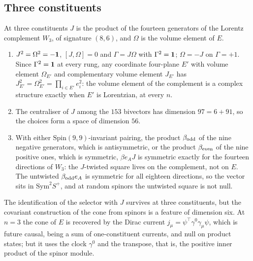 \subsection{Three constituents}

At three constituents $J$ is the product of the fourteen generators of the Lorentz complement $W_3$, of signature $(8,6)$, and $\Omega$ is the volume element of $E$.

\begin{theorem}
\label{thm:selector3}
\begin{enumerate}[label=(\roman*),leftmargin=2.2em]
\item $J^2=\Omega^2=-\mathbf 1$, $[J,\Omega]=0$ and $\Gamma=J\Omega$ with $\Gamma^2=\mathbf 1$; $\Omega=-J$ on $\Gamma=+1$. Since $\Gamma^2=\mathbf 1$ at every rung, any coordinate four-plane $E'$
with volume element $\Omega_{E'}$ and complementary volume element $J_{E'}$ has $J_{E'}^2=\Omega_{E'}^2=\prod_{i\in E'}e_i^2$: the volume element of the complement is a complex
structure exactly when $E'$ is Lorentzian, at every $n$.
\item The centraliser of $J$ among the $153$ bivectors has dimension $97=6+91$, so the choices form a space of dimension $56$.
\item With either $\mathrm{Spin}(9,9)$-invariant pairing, the product $\beta_{\rm odd}$ of the nine negative generators, which is antisymmetric, or the product $\beta_{\rm even}$
of the nine positive ones, which is symmetric, $\beta e_AJ$ is symmetric exactly for the fourteen directions of $W_3$: the $J$-twisted square lives on the complement,
not on $E$. The untwisted $\beta_{\rm odd}e_A$ is symmetric for all eighteen directions, so the vector sits in $\mathrm{Sym}^2S^+$, and at random spinors the untwisted
square is not null.
\end{enumerate}
\end{theorem}

The identification of the selector with $J$ survives at three constituents, but the covariant construction of the cone from spinors is a feature of dimension six. At
$n=3$ the cone of $E$ is recovered by the Dirac current $j_\mu=\psi^{\!\top}\gamma^0\gamma_\mu\psi$, which is future causal, being a sum of one-constituent currents, and
null on product states; but it uses the clock $\gamma^0$ and the transpose, that is, the positive inner product of the spinor module.
